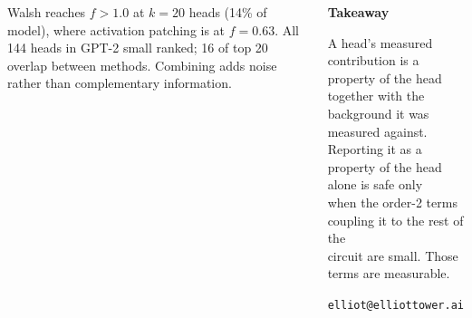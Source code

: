 \documentclass[25pt, a0paper, portrait]{tikzposter}
\begin{document}
\begin{columns}
{  \vspace{4mm}
  Walsh reaches $f > 1.0$ at $k = 20$ heads (14\% of model), where
  activation patching is at $f = 0.63$. All 144 heads in GPT-2 small
  ranked; 16 of top 20 overlap between methods. Combining adds noise
  rather than complementary information.

  \vspace{8mm}
  \begin{center}
  {\large\textbf{Takeaway}}

  \vspace{4mm}
  A head's measured contribution is a property of the head\\
  together with the background it was measured against.\\
  Reporting it as a property of the head alone is safe only\\
  when the order-2 terms coupling it to the rest of the\\
  circuit are small. Those terms are measurable.

  \vspace{6mm}
  \texttt{elliot@elliottower.ai}
  \end{center}
}

\end{columns}
\end{document}
